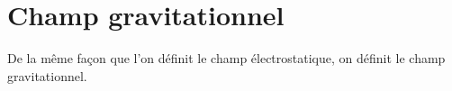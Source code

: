 
\section{Champ gravitationnel}
%

De la même façon que l'on définit le champ électrostatique, on définit le champ gravitationnel.


